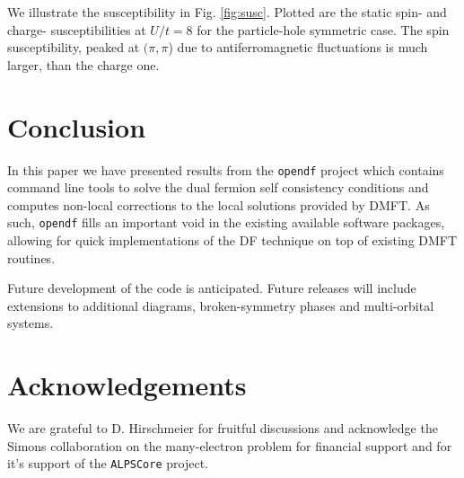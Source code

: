 \documentclass[3p,times,procedia]{elsarticle}
\begin{document}
We illustrate the susceptibility in Fig. \ref{fig:susc}. Plotted are the static spin- and charge- susceptibilities at $U/t = 8$ for the particle-hole symmetric case. The spin susceptibility, peaked at $(\pi,\pi$) due to antiferromagnetic fluctuations is much larger, than the charge one. 

\section{Conclusion}\label{sec:conclusions}
In this paper we have presented results from the \texttt{opendf} project which contains command line tools to solve the dual fermion self consistency conditions and computes non-local corrections to the local solutions provided by DMFT.  As such,  \texttt{opendf}  fills an important void in the existing available software packages, allowing for quick implementations of the DF technique on top of existing DMFT routines.  

Future development of the code is anticipated. Future releases will include extensions to additional diagrams, broken-symmetry phases and multi-orbital systems. 

\section*{Acknowledgements}
We are grateful to D. Hirschmeier for fruitful discussions and acknowledge the Simons collaboration on the many-electron problem for financial support and for it's support of the \texttt{ALPSCore} project.


\end{document}
